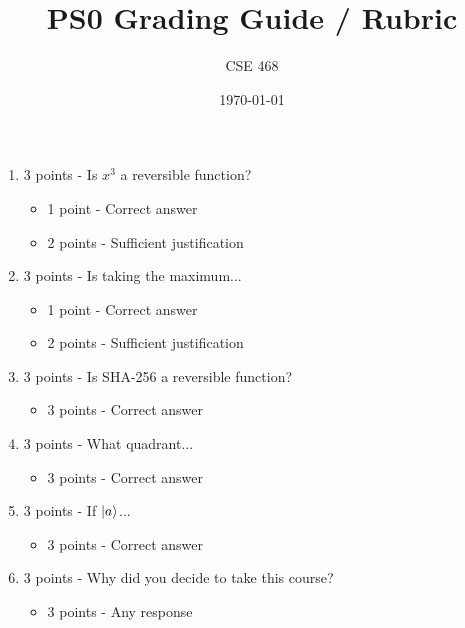 \documentclass[12pt]{article}
\title{PS0 Grading Guide / Rubric}
\author{CSE 468}
\date{\today}
\begin{document}
\maketitle

\begin{enumerate}[font=\bfseries]
    \item 3 points - Is $x^3$ a reversible function?
        \begin{itemize}
            \item 1 point - Correct answer
            \item 2 points - Sufficient justification
        \end{itemize}
    \item 3 points - Is taking the maximum...
        \begin{itemize}
            \item 1 point - Correct answer
            \item 2 points - Sufficient justification
        \end{itemize}
    \item 3 points - Is SHA-256 a reversible function?
        \begin{itemize}
            \item 3 points - Correct answer
        \end{itemize}
    \item 3 points - What quadrant...
        \begin{itemize}
            \item 3 points - Correct answer
        \end{itemize}
    \item 3 points - If $\ket{a}$...
        \begin{itemize}
            \item 3 points - Correct answer
        \end{itemize}
    \item 3 points - Why did you decide to take this course?
        \begin{itemize}
            \item 3 points - Any response
        \end{itemize}
\end{enumerate}
\end{document}
